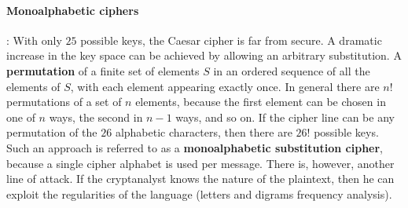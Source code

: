 \documentclass[11pt]{article}
\begin{document}
\paragraph{Monoalphabetic ciphers} : With only $25$ possible keys, the Caesar cipher is far from secure. A dramatic increase in the key space can be achieved by allowing an arbitrary substitution. A \textbf{permutation} of a finite set of elements $S$ in an ordered sequence of all the elements of $S$, with each element appearing exactly once. In general there are $n!$ permutations of a set of $n$ elements, because the first element can be chosen in one of $n$ ways, the second in $n - 1$ ways, and so on. If the cipher line can be any permutation of the $26$ alphabetic characters, then there are $26!$ possible keys. Such an approach is referred to as a \textbf{monoalphabetic substitution cipher}, because a single cipher alphabet is used per message. There is, however, another line of attack. If the cryptanalyst knows the nature of the plaintext, then he can exploit the regularities of the language (letters and digrams frequency analysis).
\end{document}
